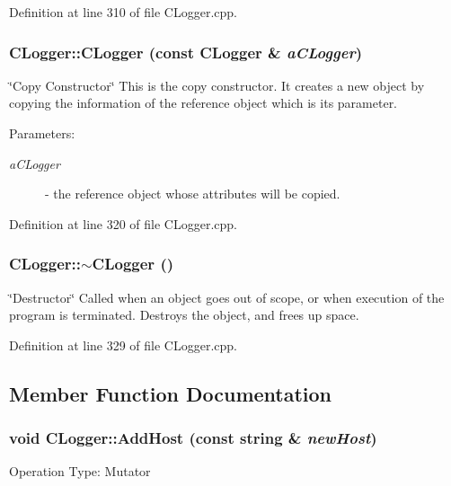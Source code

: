 Definition at line 310 of file CLogger.cpp.
\subsubsection{\setlength{\rightskip}{0pt plus 5cm}CLogger::CLogger (const CLogger \& {\em a\-CLogger})}\label{classCLogger_a1}


\char`\"{}Copy Constructor\char`\"{} This is the copy constructor. It creates a new object by copying the information of the reference object which is its parameter.\begin{Desc}
\item[Parameters: ]\par
\begin{description}
\item[{\em 
a\-CLogger}]- the reference object whose attributes will be copied. \end{description}
\end{Desc}


Definition at line 320 of file CLogger.cpp.
\subsubsection{\setlength{\rightskip}{0pt plus 5cm}CLogger::$\sim$CLogger ()}\label{classCLogger_a2}


\char`\"{}Destructor\char`\"{} Called when an object goes out of scope, or when execution of the program is terminated. Destroys the object, and frees up space. 

Definition at line 329 of file CLogger.cpp.

\subsection{Member Function Documentation}
\subsubsection{\setlength{\rightskip}{0pt plus 5cm}void CLogger::Add\-Host (const string \& {\em new\-Host})}\label{classCLogger_a7}


Operation Type: Mutator

